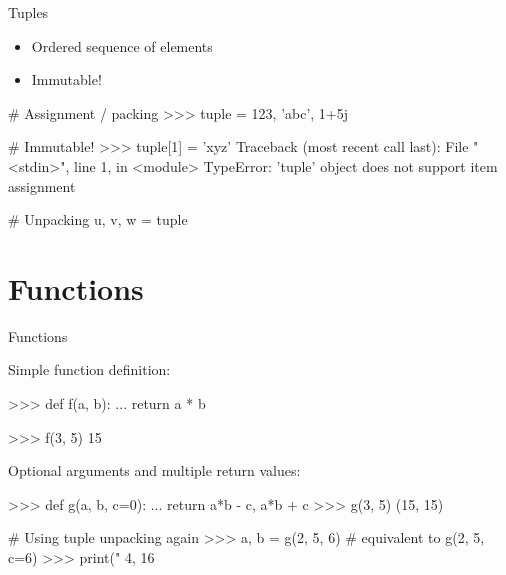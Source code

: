 \documentclass[10pt]{beamer}
\begin{document}

\begin{frame}[fragile]{Tuples}

    \begin{itemize}
        \item \pause Ordered sequence of elements
        \item \pause Immutable!
    \end{itemize}

    \begin{pythoncode}
        # Assignment / packing
        >>> tuple = 123, 'abc', 1+5j
    \end{pythoncode}

    \pause

    \begin{pythoncode}
        # Immutable!
        >>> tuple[1] = 'xyz'
        Traceback (most recent call last):
          File "<stdin>", line 1, in <module>
        TypeError: 'tuple' object does not support item assignment
    \end{pythoncode}

    \pause

    \begin{pythoncode}
        # Unpacking
        u, v, w = tuple
    \end{pythoncode}

\end{frame}


\section{Functions}


\begin{frame}[fragile]{Functions}

    Simple function definition:

    \begin{pythoncode}
        >>> def f(a, b):
        ...     return a * b

        >>> f(3, 5)
        15
    \end{pythoncode}

    \pause

    Optional arguments and multiple return values:

    \begin{pythoncode}
        >>> def g(a, b, c=0):
        ...     return a*b - c, a*b + c
        >>> g(3, 5)
        (15, 15)

        # Using tuple unpacking again
        >>> a, b = g(2, 5, 6)  # equivalent to g(2, 5, c=6)
        >>> print("%
        4, 16
    \end{pythoncode}

\end{frame}
\end{document}
